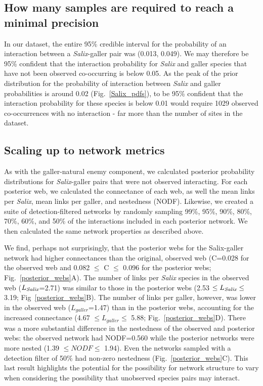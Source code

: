 \documentclass[12pt]{article}
\begin{document}
    \subsection*{How many samples are required to reach a minimal precision}

        In our dataset, the entire 95\% credible interval for the probability of an interaction between a \emph{Salix}-galler pair was (0.013, 0.049). We may therefore be 95\% confident that the interaction probability for \emph{Salix} and galler species that have not been observed co-occurring is below 0.05. As the peak of the prior distribution for the probability of interaction between \emph{Salix} and galler probabilities is around 0.02 (Fig.~\ref{Salix_pdfs}), to be 95\% confident that the interaction probability for these species is below 0.01 would require 1029 observed co-occurrences with no interaction - far more than the number of sites in the~\citep{Kopelke2017} dataset.


    \subsection*{Scaling up to network metrics}

      As with the galler-natural enemy component, we calculated posterior probability distributions for \emph{Salix}-galler pairs that were not observed interacting. For each posterior web, we calculated the connectance of each web, as well the mean links per \emph{Salix}, mean links per galler, and nestedness (NODF). Likewise, we created a suite of detection-filtered networks by randomly sampling 99\%, 95\%, 90\%, 80\%, 70\%, 60\%, and 50\% of the interactions included in each posterior network. We then calculated the same network properties as described above.


      We find, perhaps not surprisingly, that the posterior webs for the Salix-galler network  had higher connectances than the original, observed web (C=0.028 for the observed web and 0.082 $\leq$ C $\leq$ 0.096 for the posterior webs; Fig.~\ref{posterior_webs}A). The number of links per \emph{Salix} species in the observed web ($L_{\emph{Salix}}$=2.71) was similar to those in the posterior webs (2.53 $\leq L_{\emph{Salix}} \leq$ 3.19; Fig~\ref{posterior_webs}B). The number of links per galler, however, was lower in the observed web ($L_{galler}$=1.47) than in the posterior webs, accounting for the increased connectance (4.67 $\leq L_{galler} \leq$ 5.88; Fig.~\ref{posterior_webs}D). There was a more substantial difference in the nestedness of the observed and posterior webs: the observed network had NODF=0.560 while the posterior networks were more nested (1.39 $\leq NODF \leq$ 1.94). Even the networks sampled with a detection filter of 50\% had non-zero nestedness (Fig.~\ref{posterior_webs}C). This last result highlights the potential for the possibility for network structure to vary when considering the possibility that unobserved species pairs may interact.
\end{document}
